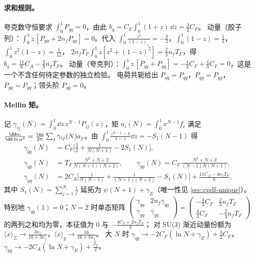 \paragraph{求和规则。}
夸克数守恒要求 $\int_0^1P_{qq}=0$，由此 $b_q=C_F\int_0^1(1+z)\,\dd z=\frac32C_F$。
动量（胶子列）：$\int_0^1z\,[P_{gg}+2n_fP_{qg}]=0$。代入 $\int_0^1\frac{z^2}{(1-z)_+}=-\frac32$，$\int_0^1(1-z)=\frac12$，$\int_0^1z^2(1-z)=\frac1{12}$，
$2n_fT_F\int_0^1z[z^2+(1-z)^2]=\frac23n_fT_F$，得 $b_g=\frac{11}{6}C_A-\frac23n_fT_F$。
动量（夸克列）：$\int_0^1z\,[P_{qq}+P_{gq}]=-\frac43C_F+\frac43C_F=0$，这是一个不含任何待定参数的独立检验。
电荷共轭给出 $P_{\bar q\bar q}=P_{qq}$，$P_{\bar qg}=P_{qg}$，$P_{g\bar q}=P_{gq}$；领头阶 $P_{q\bar q}=0$。

\paragraph{Mellin 矩。}
记 $\gamma_{ij}(N)=\int_0^1\dd z\,z^{N-1}P_{ij}(z)$，矩 $a_i(N)=\int_0^1x^{N-1}f_i$ 满足
$\frac{\dd a_i}{\dd\ln\mu^2}=\frac{\as}{2\pi}\sum_j\gamma_{ij}(N)a_j$。由 $\int_0^1\frac{z^{N-1}-1}{1-z}\dd z=-S_1(N-1)$ 得
\begin{equation}\label{eq:cpdf-gammas}
\begin{aligned}
\gamma_{qq}(N)&=C_F\Big[\frac32+\frac{1}{N(N+1)}-2S_1(N)\Big],\\
\gamma_{qg}(N)&=T_F\,\frac{N^2+N+2}{N(N+1)(N+2)},\qquad
\gamma_{gq}(N)=C_F\,\frac{N^2+N+2}{(N-1)N(N+1)},\\
\gamma_{gg}(N)&=2C_A\Big[\frac{1}{N(N-1)}+\frac{1}{(N+1)(N+2)}-S_1(N)\Big]+\frac{11C_A-4n_fT_F}{6},
\end{aligned}
\end{equation}
其中 $S_1(N)=\sum_{j=1}^N\frac1j$ 延拓为 $\psi(N+1)+\gamma_E$（唯一性见 \cref{sec:cpdf-unique}）。
特别地 $\gamma_{qq}(1)=0$；$N=2$ 时单态矩阵 $\begin{pmatrix}\gamma_{qq}&2n_f\gamma_{qg}\\ \gamma_{gq}&\gamma_{gg}\end{pmatrix}
=\begin{pmatrix}-\frac43C_F&\frac23n_fT_F\\ \frac43C_F&-\frac23n_fT_F\end{pmatrix}$ 的两列之和均为零，本征值为 $0$ 与 $-\frac{4C_F+2n_fT_F}{3}$；
对 SU(3) 渐近动量份额为 $\langle x\rangle_\Sigma\to\frac{3n_f}{16+3n_f}$，$\langle x\rangle_g\to\frac{16}{16+3n_f}$。
大 $N$ 时 $\gamma_{qq}\to-2C_F(\ln N+\gamma_E)+\frac32C_F$，$\gamma_{gg}\to-2C_A(\ln N+\gamma_E)+\frac{\beta_0}{2}$。

